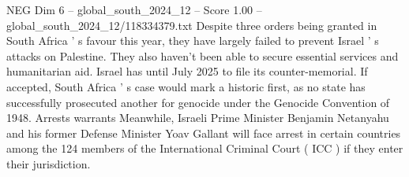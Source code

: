 \begin{textsample}{NEG Dim 6 – global\_south\_2024\_12 – Score 1.00 – global\_south\_2024\_12/118334379.txt}
Despite three orders being granted in South Africa ' s favour this year, they have largely failed to prevent Israel ' s attacks on Palestine.
They also haven't been able to secure essential services and humanitarian aid.
Israel has until July 2025 to file its counter-memorial.
If accepted, South Africa ' s case would mark a historic first, as no state has successfully prosecuted another for genocide under the Genocide Convention of 1948.
Arrests warrants Meanwhile, Israeli Prime Minister Benjamin Netanyahu and his former Defense Minister Yoav Gallant will face arrest in certain countries among the 124 members of the International Criminal Court ( ICC ) if they enter their jurisdiction.

\end{textsample}
